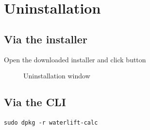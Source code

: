 \documentclass[a5paper, 10pt]{article}
\begin{document}
\pagebreak

\section{Uninstallation}
    \subsection{Via the installer}
        Open the downloaded installer and click  button\\
            \begin{figure}[h]
                \centering
                \caption{Uninstallation window}
                \label{fig:uninstallation_window}
            \end{figure}
            
    \subsection{Via the CLI}
        \lstset{language=bash, frame=lines}
        \begin{lstlisting}
sudo dpkg -r waterlift-calc
        \end{lstlisting}
        
\end{document}
